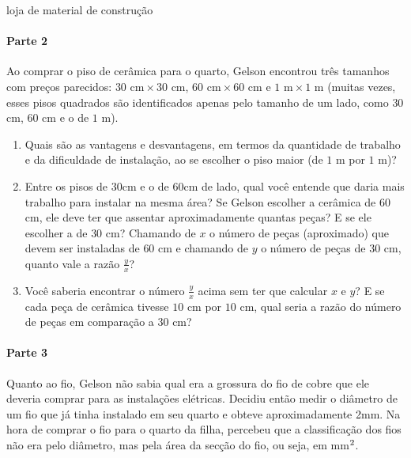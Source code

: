 \begin{task}{loja de material de construção}
\begin{enumerate}
\end{enumerate}

\paragraph{Parte 2}

Ao comprar o piso de cerâmica para o quarto, Gelson encontrou três tamanhos com preços parecidos: $30\text{ cm} \times 30\text{ cm}$, $60\text{ cm} \times 60\text{ cm}$ e $1\text{ m} \times 1\text{ m}$ (muitas vezes, esses pisos quadrados são identificados apenas pelo tamanho de um lado, como $30$ cm, $60$ cm e o de $1$ m).
\begin{enumerate}
\item {} 
Quais são as vantagens e desvantagens, em termos da quantidade de trabalho e da dificuldade de instalação, ao se escolher o piso maior (de $1$ m por $1$ m)?

\item {} 
Entre os pisos de 30cm e o de 60cm de lado, qual você entende que daria mais trabalho para instalar na mesma área? Se Gelson escolher a cerâmica de $60$ cm, ele deve ter que assentar aproximadamente quantas peças? E se ele escolher a de $30$ cm? Chamando de $x$ o número de peças (aproximado) que devem ser instaladas de $60$ cm e chamando de $y$ o número de peças de $30$ cm, quanto vale a razão \(\frac{y}{x}\)?

\item {} 
Você saberia encontrar o número \(\frac{y}{x}\) acima sem ter que calcular $x$ e $y$? E se cada peça de cerâmica tivesse $10$ cm por $10$ cm, qual seria a razão do número de peças em comparação a $30$ cm?

\end{enumerate}

\paragraph{Parte 3}

Quanto ao fio, Gelson não sabia qual era a grossura do fio de cobre que ele deveria comprar para as instalações elétricas. Decidiu então medir o diâmetro de um fio que já tinha instalado em seu quarto e obteve aproximadamente 2mm. Na hora de comprar o fio para o quarto da filha, percebeu que a classificação dos fios não era pelo diâmetro, mas pela área da secção do fio, ou seja, em mm\(\sp{\text{2}}\).

\begin{figure}[H]
\centering


\end{figure}
\end{task}
